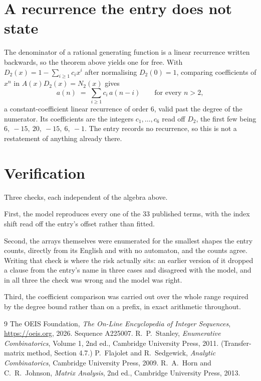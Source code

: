 \documentclass[11pt,a4paper]{article}
\theoremstyle{plain}
\theoremstyle{definition}
\begin{document}
\section{A recurrence the entry does not state}

The denominator of a rational generating function is a linear recurrence written backwards, so
the theorem above yields one for free. With $D_2(x)=1-\sum_{i\ge1}c_ix^i$ after normalising
$D_2(0)=1$, comparing coefficients of $x^n$ in $A(x)D_2(x)=N_2(x)$ gives
\[
a(n)\;=\;\sum_{i\ge1}c_i\,a(n-i)\qquad\text{for every }n>2,
\]
a constant-coefficient linear recurrence of order $6$, valid past the degree of the
numerator. Its coefficients are the integers $c_1,\dots,c_{6}$ read off $D_2$, the first few being $6,\ -15,\ 20,\ -15,\ 6,\ -1$. The entry records no recurrence, so this is not a restatement of anything
already there.

\section{Verification}

Three checks, each independent of the algebra above.

First, the model reproduces every one of the $33$ published terms, with the index shift
read off the entry's offset rather than fitted.

Second, the arrays themselves were enumerated for the smallest shapes the entry counts,
directly from its English and with no automaton, and the counts agree. Writing that check is
where the risk actually sits: an earlier version of it dropped a clause from the entry's name
in three cases and disagreed with the model, and in all three the check was wrong and the model
was right.

Third, the coefficient comparison was carried out over the whole range required by the degree
bound rather than on a prefix, in exact arithmetic throughout.

\begin{thebibliography}{9}
 The OEIS Foundation, \emph{The On-Line Encyclopedia of Integer
Sequences}, \url{https://oeis.org}, 2026. Sequence A225007.
 R.~P.~Stanley, \emph{Enumerative Combinatorics}, Volume 1, 2nd ed.,
Cambridge University Press, 2011. (Transfer-matrix method, Section 4.7.)
 P.~Flajolet and R.~Sedgewick, \emph{Analytic Combinatorics}, Cambridge
University Press, 2009.
 R.~A.~Horn and C.~R.~Johnson, \emph{Matrix Analysis}, 2nd ed., Cambridge
University Press, 2013.
\end{thebibliography}
\end{document}

